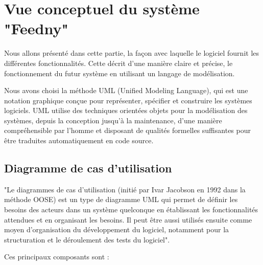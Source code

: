 \section{Vue conceptuel du système "Feedny"}
Nous allons présenté dans cette partie, la façon avec laquelle le logiciel fournit les différentes fonctionnalités. Cette décrit d'une manière claire et précise, le fonctionnement du futur système en utilisant un langage de modélisation. 

Nous avons choisi la méthode UML (Unified Modeling Language), qui est une notation graphique conçue pour représenter, spécifier et construire les systèmes logiciels. UML utilise des techniques orientées objets pour la modélisation des systèmes, depuis la conception jusqu'à la maintenance, d'une manière compréhensible par l'homme et disposant de qualités formelles suffisantes pour être traduites automatiquement en code source.\cite{UML}

\subsection{Diagramme de cas d'utilisation}
"Le diagrammes de cas d'utilisation (initié par Ivar Jacobson en 1992 dans la méthode OOSE) est un type de diagramme UML qui permet de définir les besoins des acteurs dans un système quelconque en établissant les fonctionnalités attendues et en organisant les besoins. Il peut être aussi utilisés ensuite comme moyen d'organisation du développement du logiciel, notamment pour la structuration et le déroulement des tests du logiciel".\cite{UML}

Ces principaux composants sont :

